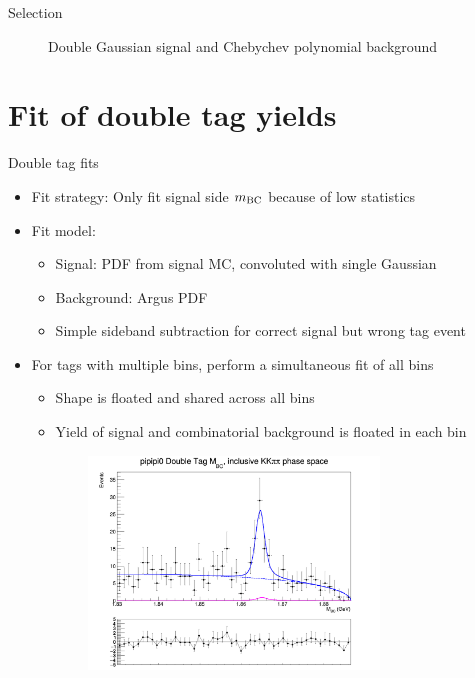 \documentclass{beamer}
\begin{document}
\begin{frame}{Selection}
\begin{figure}
\begin{subfigure}{0.5\textwidth}
    \end{subfigure}
    \caption{Double Gaussian signal and Chebychev polynomial background}
  \end{figure}
\end{frame}

\section{Fit of double tag yields}
\begin{frame}{Double tag fits}
  \begin{itemize}
    \item{Fit strategy: Only fit signal side $m_{\rm BC}$ because of low statistics}
    \item{Fit model:}
    \begin{itemize}
      \item{Signal: PDF from signal MC, convoluted with single Gaussian}
      \item{Background: Argus PDF}
      \item{Simple sideband subtraction for correct signal but wrong tag event}
    \end{itemize}
    \item{For tags with multiple bins, perform a simultaneous fit of all bins}
    \begin{itemize}
      \item{Shape is floated and shared across all bins}
      \item{Yield of signal and combinatorial background is floated in each bin}
    \end{itemize}
  \end{itemize}
  \begin{figure}
    \centering
    \begin{subfigure}{0.5\textwidth}
      \centering
      \includegraphics[width=0.85\textwidth]{Plots/DoubleTagYield_DoubleTag_CP_KKpipi_vs_pipipi0_SignalBin0.png}

\end{subfigure}
\end{figure}
\end{frame}
\end{document}
